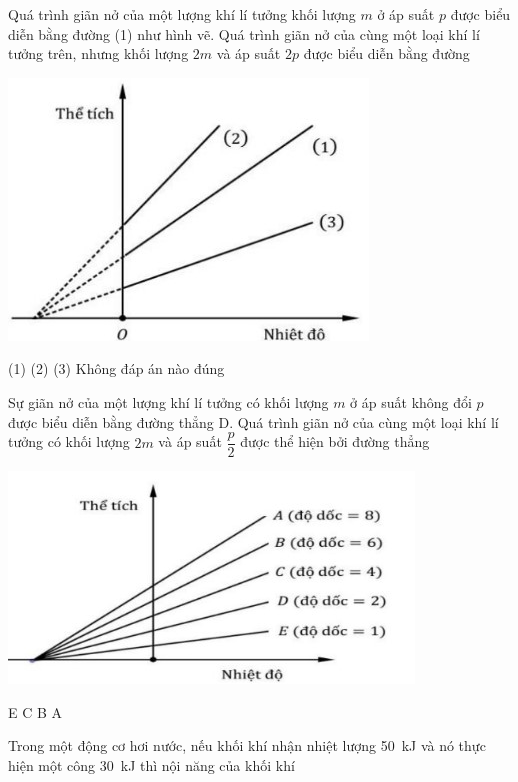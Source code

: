 \begin{ex}
Quá trình giãn nở của một lượng khí lí tưởng khối lượng $m$ ở áp suất $p$ được biểu diễn bằng đường (1) như hình vẽ. Quá trình giãn nở của cùng một loại khí lí tưởng trên, nhưng khối lượng $2m$ và áp suất $2p$ được biểu diễn bằng đường
\begin{center}
	\includegraphics[width=0.35\linewidth]{figs/VN12-Y24-PH-SYL-014P-5}
\end{center}
	
	\choice
	{\True (1)}
	{(2)}
	{(3)}
	{Không đáp án nào đúng}
\end{ex}
\begin{ex}
	Sự giãn nở của một lượng khí lí tưởng có khối lượng $m$ ở áp suất không đổi $p$ được biểu diễn bằng đường thẳng D. Quá trình giãn nở của cùng một loại khí lí tưởng có khối lượng $2m$ và áp suất $\dfrac{p}{2}$ được thể hiện bởi đường thẳng
	\begin{center}
		\includegraphics[width=0.45\linewidth]{figs/VN12-Y24-PH-SYL-014P-6}
	\end{center} 
	
	\choice
	{E}
	{C}
	{B}
	{\True A}
\end{ex}
\begin{ex}
	Trong một động cơ hơi nước, nếu khối khí nhận nhiệt lượng \SI{50}{\kilo\joule} và nó thực hiện một công \SI{30}{\kilo\joule} thì nội năng của khối khí
	\loigiai{}
\end{ex}
